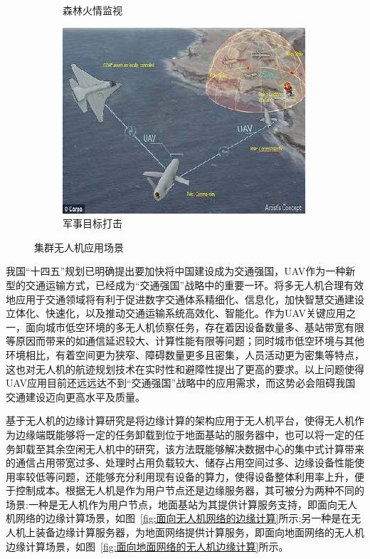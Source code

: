 \begin{figure}[!htbp]
\begin{subfigure}[t]{0.31\textwidth}
\begin{minipage}[b]{1\linewidth}
            \caption{森林火情监视}
        \end{minipage}
    \end{subfigure}
    \begin{subfigure}[t]{0.305\textwidth}
        \captionsetup{justification=centering}
        \begin{minipage}[b]{1\linewidth}
            \includegraphics[width=\textwidth]{./images/军事目标打击.png}
            \caption{军事目标打击}
        \end{minipage}
    \end{subfigure}

    \caption{集群无人机应用场景}
    \label{fig:集群无人机应用场景}
\end{figure}

我国“十四五”规划已明确提出要加快将中国建设成为交通强国，UAV作为一种新型的交通运输方式，已经成为“交通强国”战略中的重要一环。将多无人机合理有效地应用于交通领域将有利于促进数字交通体系精细化、信息化，加快智慧交通建设立体化、快速化，以及推动交通运输系统高效化、智能化。作为UAV关键应用之一，面向城市低空环境的多无人机侦察任务，存在着因设备数量多、基站带宽有限等原因而带来的如通信延迟较大、计算性能有限等问题；同时城市低空环境与其他环境相比，有着空间更为狭窄、障碍数量更多且密集，人员活动更为密集等特点，这也对无人机的航迹规划技术在实时性和避障性提出了更高的要求。以上问题使得UAV应用目前还远远达不到“交通强国”战略中的应用需求，而这势必会阻碍我国交通建设迈向更高水平及质量。

基于无人机的边缘计算研究是将边缘计算的架构应用于无人机平台，使得无人机作为边缘端既能够将一定的任务卸载到位于地面基站的服务器中，也可以将一定的任务卸载至其余空闲无人机中的研究，该方法既能够解决数据中心的集中式计算带来的通信占用带宽过多、处理时占用负载较大、储存占用空间过多、边缘设备性能使用率较低等问题，还能够充分利用现有设备的算力，使得设备整体利用率上升，便于控制成本。根据无人机是作为用户节点还是边缘服务器，其可被分为两种不同的场景:一种是无人机作为用户节点，地面基站为其提供计算服务支持，即面向无人机网络的边缘计算场景，如图~\ref{fig:面向无人机网络的边缘计算}所示;另一种是在无人机上装备边缘计算服务器，为地面网络提供计算服务，即面向地面网络的无人机边缘计算场景，如图~\ref{fig:面向地面网络的无人机边缘计算}所示。

